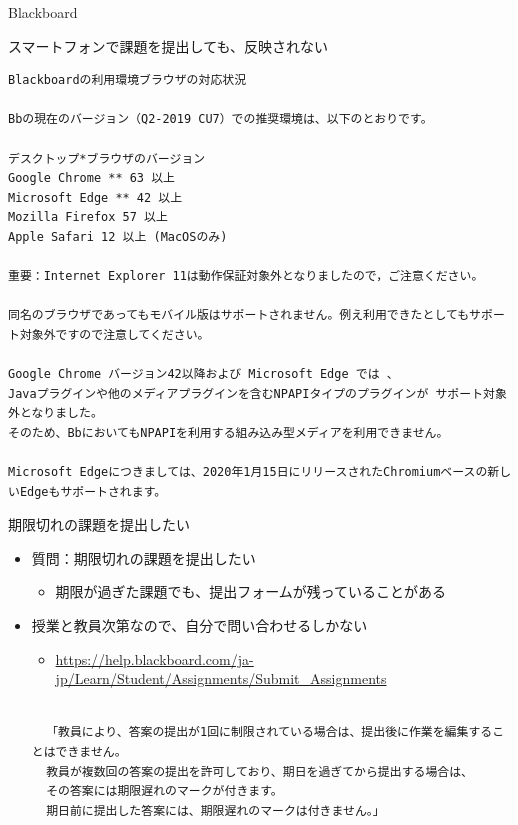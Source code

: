 \documentclass[a4j,10pt]{jsarticle}
\begin{document}
{\begin{frame}[label={sec:org166405d},fragile]{Blackboard}
\begin{block}{スマートフォンで課題を提出しても、反映されない}
\begin{verbatim}
Blackboardの利用環境ブラウザの対応状況

Bbの現在のバージョン（Q2-2019 CU7）での推奨環境は、以下のとおりです。

デスクトップ*ブラウザのバージョン
Google Chrome ** 63 以上
Microsoft Edge ** 42 以上
Mozilla Firefox 57 以上
Apple Safari 12 以上 (MacOSのみ)

重要：Internet Explorer 11は動作保証対象外となりましたので，ご注意ください。

同名のブラウザであってもモバイル版はサポートされません。例え利用できたとしてもサポート対象外ですので注意してください。

Google Chrome バージョン42以降および Microsoft Edge では 、
Javaプラグインや他のメディアプラグインを含むNPAPIタイプのプラグインが サポート対象外となりました。
そのため、BbにおいてもNPAPIを利用する組み込み型メディアを利用できません。

Microsoft Edgeにつきましては、2020年1月15日にリリースされたChromiumベースの新しいEdgeもサポートされます。\end{verbatim}

\end{block}
\par
\begin{block}{期限切れの課題を提出したい}
\begin{itemize}
\item 質問：期限切れの課題を提出したい
\begin{itemize}
\item 期限が過ぎた課題でも、提出フォームが残っていることがある
\end{itemize}
\par
\item 授業と教員次第なので、自分で問い合わせるしかない
\begin{itemize}
\item \url{https://help.blackboard.com/ja-jp/Learn/Student/Assignments/Submit\_Assignments}
\end{itemize}
\par
\begin{verbatim}

  「教員により、答案の提出が1回に制限されている場合は、提出後に作業を編集することはできません。
  教員が複数回の答案の提出を許可しており、期日を過ぎてから提出する場合は、
  その答案には期限遅れのマークが付きます。
  期日前に提出した答案には、期限遅れのマークは付きません。」\end{verbatim}


\end{itemize}
\end{block}
\end{frame}}
\end{document}
